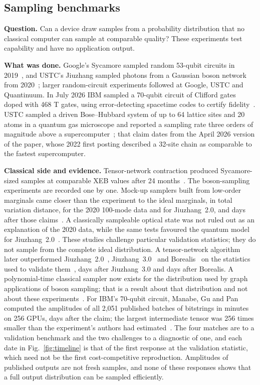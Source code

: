 \documentclass[10pt,a4paper]{article}
\begin{document}
\subsection{Sampling benchmarks}
\textbf{Question.} Can a device draw samples from a probability distribution that no classical computer can sample at comparable quality? These experiments test capability and have no application output.

\textbf{What was done.} Google's Sycamore sampled random 53-qubit circuits in 2019~\cite{arute2019}, and USTC's Jiuzhang sampled photons from a Gaussian boson network from 2020~\cite{zhong2020}; larger random-circuit experiments followed at Google, USTC and Quantinuum. In July 2026 IBM sampled a 70-qubit circuit of Clifford gates doped with 468 T gates, using error-detecting spacetime codes to certify fidelity~\cite{martiel2026}. USTC sampled a driven Bose--Hubbard system of up to 64 lattice sites and 20 atoms in a quantum gas microscope and reported a sampling rate three orders of magnitude above a supercomputer~\cite{zheng2026}; that claim dates from the April 2026 version of the paper, whose 2022 first posting described a 32-site chain as comparable to the fastest supercomputer.

\textbf{Classical side and evidence.} Tensor-network contraction produced Sycamore-sized samples at comparable XEB values after 24 months~\cite{pan2022}. The boson-sampling experiments are recorded one by one. Mock-up samplers built from low-order marginals came closer than the experiment to the ideal marginals, in total variation distance, for the 2020 100-mode data and for Jiuzhang~2.0,  and  days after those claims~\cite{villalonga2021}. A classically sampleable optical state was not ruled out as an explanation of the 2020 data, while the same tests favoured the quantum model for Jiuzhang~2.0~\cite{martinez2023}. These studies challenge particular validation statistics; they do not sample from the complete ideal distribution. A tensor-network algorithm later outperformed Jiuzhang~2.0~\cite{zhong2021}, Jiuzhang~3.0~\cite{deng2023} and Borealis~\cite{madsen2022} on the statistics used to validate them~\cite{oh2024},  days after Jiuzhang~3.0 and  days after Borealis. A polynomial-time classical sampler now exists for the distribution used by graph applications of boson sampling; that is a result about that distribution and not about these experiments~\cite{anand2026}. For IBM's 70-qubit circuit, Manabe, Gu and Pan computed the amplitudes of all 2{,}051 published batches of bitstrings in \dcMin{} minutes on 256 GPUs,  days after the claim; the largest intermediate tensor was 256 times smaller than the experiment's authors had estimated~\cite{manabe2026}. The four matches are to a validation benchmark and the two challenges to a diagnostic of one, and each date in Fig.~\ref{fig:timeline} is that of the first response at the validation statistic, which need not be the first cost-competitive reproduction. Amplitudes of published outputs are not fresh samples, and none of these responses shows that a full output distribution can be sampled efficiently.
\end{document}
